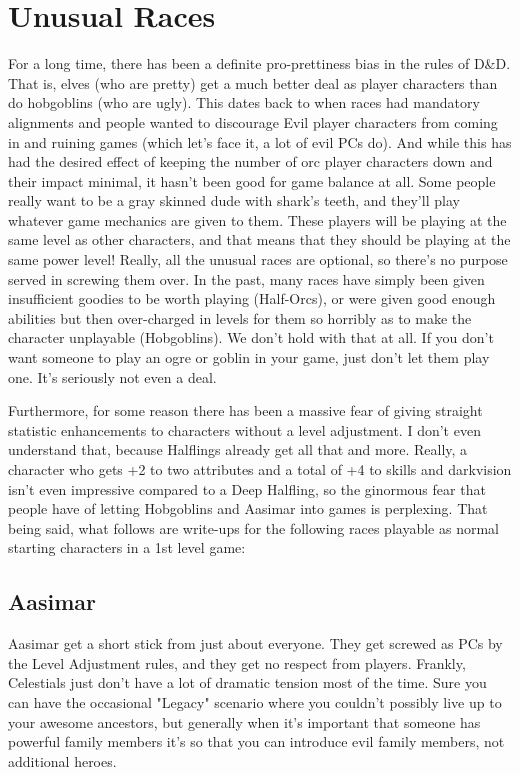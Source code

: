 
\section{Unusual Races}

For a long time, there has been a definite pro-prettiness bias in the rules of D\&D. That is, elves (who are pretty) get a much better deal as player characters than do hobgoblins (who are ugly). This dates back to when races had mandatory alignments and people wanted to discourage Evil player characters from coming in and ruining games (which let's face it, a lot of evil PCs do). And while this has had the desired effect of keeping the number of orc player characters down and their impact minimal, it hasn't been good for game balance at all. Some people really want to be a gray skinned dude with shark's teeth, and they'll play whatever game mechanics are given to them. These players will be playing at the same level as other characters, and that means that they should be playing at the same power level! Really, all the unusual races are optional, so there's no purpose served in screwing them over. In the past, many races have simply been given insufficient goodies to be worth playing (Half-Orcs), or were given good enough abilities but then over-charged in levels for them so horribly as to make the character unplayable (Hobgoblins). We don't hold with that at all. If you don't want someone to play an ogre or goblin in your game, just don't let them play one. It's seriously not even a deal.

Furthermore, for some reason there has been a massive fear of giving straight statistic enhancements to characters without a level adjustment. I don't even understand that, because Halflings already get all that and more. Really, a character who gets +2 to two attributes and a total of +4 to skills and darkvision isn't even impressive compared to a Deep Halfling, so the ginormous fear that people have of letting Hobgoblins and Aasimar into games is perplexing. That being said, what follows are write-ups for the following races playable as normal starting characters in a 1st level game:

\subsection{Aasimar}
\vspace*{-8pt}

Aasimar get a short stick from just about everyone. They get screwed as PCs by the Level Adjustment rules, and they get no respect from players. Frankly, Celestials just don't have a lot of dramatic tension most of the time. Sure you can have the occasional "Legacy" scenario where you couldn't possibly live up to your awesome ancestors, but generally when it's important that someone has powerful family members it's so that you can introduce evil family members, not additional heroes.

